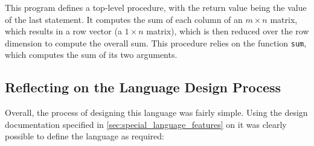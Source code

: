 This program defines a top-level procedure, with the return value being the value of the last statement. 
It computes the sum of each column of an $m \times n$ matrix, which results in a row vector (a $1 \times n$ matrix), which is then reduced over the row dimension to compute the overall sum.
This procedure relies on the function \texttt{sum}, which computes the sum of its two arguments. 


\subsection{Reflecting on the Language Design Process} %
\label{sub:reflecting_on_the_language_design_process}
Overall, the process of designing this language was fairly simple.
Using the design documentation specified in \autoref{sec:special_language_features} on  it was clearly possible to define the language as required:
